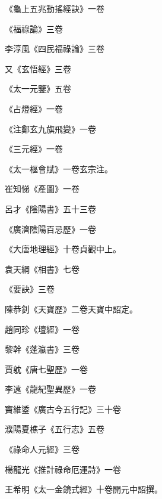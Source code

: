 \begin{pinyinscope}
 《龜上五兆動搖經訣》一卷



 《福祿論》三卷



 李淳風《四民福祿論》三卷



 又《玄悟經》三卷



 《太一元鑒》五卷



 《占燈經》一卷



 《注鄭玄九旗飛變》一卷



 《三元經》一卷



 《太一樞會賦》一卷玄宗注。



 崔知悌《產圖》一卷



 呂才《陰陽書》五十三卷



 《廣濟陰陽百忌歷》一卷



 《大唐地理經》十卷貞觀中上。



 袁天綱《相書》七卷



 《要訣》三卷



 陳恭釗《天寶歷》二卷天寶中詔定。



 趙同珍《壇經》一卷



 黎幹《蓬瀛書》三卷



 賈躭《唐七聖歷》一卷



 李遠《龍紀聖異歷》一卷



 竇維鋈《廣古今五行記》三十卷



 濮陽夏樵子《五行志》五卷



 《祿命人元經》三卷



 楊龍光《推計祿命厄運詩》一卷



 王希明《太一金鏡式經》十卷開元中詔撰。




\end{pinyinscope}
